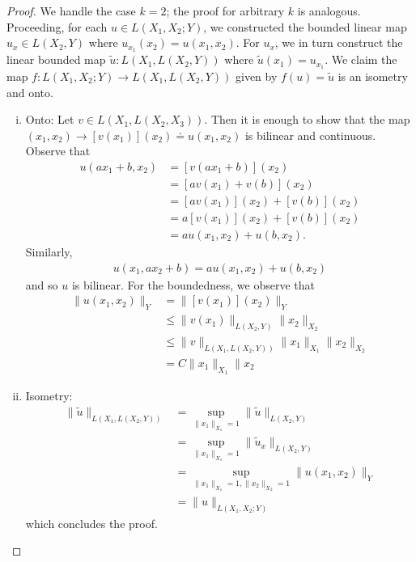 \documentclass[12pt,reqno]{amsart}
\numberwithin{equation}{section}  %
\begin{document}
\begin{proof}
We handle the case $k=2$; the proof for arbitrary $k$ is analogous. Proceeding,
for each $u \in L(X_{1}, X_{2}; Y)$, we constructed the bounded linear map
$u_{x} \in L(X_{2}, Y)$ where $u_{x_{1}}(x_{2}) = u(x_{1}, x_{2})$. For
$u_{x}$, we in turn construct the linear bounded map $\tilde{u}: L(X_{1},
L(X_{2}, Y))$ where $\tilde{u}(x_{1}) = u_{x_{1}}$. We claim the map $f:
L(X_{1}, X_{2}; Y) \to L(X_{1}, L(X_{2}, Y))$ given by $f(u) = \tilde{u}$ is an
isometry and onto.
\begin{enumerate}[i)]
\item{}Onto: Let $v \in L(X_{1}, L(X_{2}, X_{3}))$. Then it is enough to
show that the map $(x_{1}, x_{2}) \to [v(x_{1})](x_{2}) \doteq
u(x_{1}, x_{2})$ is bilinear and continuous. Observe that
%
%
\begin{equation*}
\begin{split}
u(ax_{1} + b, x_{2} )
& = [v(ax_{1} + b)](x_{2})
\\
& = [av(x_{1}) + v(b)](x_{2})
\\
& = [av(x_{1})](x_{2}) + [v(b)](x_{2})
\\
& = a[v(x_{1})](x_{2}) + [v(b)](x_{2})
\\
& = au(x_{1}, x_{2}) + u(b, x_{2}).
\end{split}
\end{equation*}
%
%
Similarly, 
%
%
\begin{equation*}
\begin{split}
u(x_{1}, ax_{2} + b) = au(x_{1}, x_{2}) + u(b, x_{2})
\end{split}
\end{equation*}
%
%
and so $u$ is bilinear. For the boundedness, we observe that
%
%
\begin{equation*}
\begin{split}
\| u(x_{1}, x_{2}) \|_{Y} 
& = \| [v(x_{1})](x_{2}) \|_{Y}
\\
& \le \| v(x_{1}) \|_{L(X_{2}, Y)} \| x_{2} \|_{X_{2}}
\\
& \le \| v \|_{L(X_{1}, L(X_{2}, Y))} \| x_{1} \|_{X_{1}} \| x_{2}
\|_{X_{2}}
\\
& = C\| x_{1} \|_{X_{1}} \| x_{2}
\end{split}
\end{equation*}
%
%
\item{}Isometry:
%
%
\begin{equation*}
\begin{split}
\| \tilde{u} \|_{L(X_{1}, L(X_{2}, Y))}
& = \sup_{\| x_{1} \|_{X_{1}} = 1} \| \tilde{u} \|_{L(X_{2}, Y)}
\\
& = \sup_{\| x_{1} \|_{X_{1}} = 1} \| \tilde{u}_{x} \|_{L(X_{2},
Y)}
\\
& = \sup_{\| x_{1} \|_{X_{1}} = 1, \| x_{2} \|_{X_{2}} = 1} \|
u(x_{1}, x_{2}) \|_{Y}
\\
& = \| u \|_{L(X_{1}, X_{2}; Y)}
\end{split}
\end{equation*}
%
%
which concludes the proof. 

\end{enumerate}
\end{proof}
\end{document}
